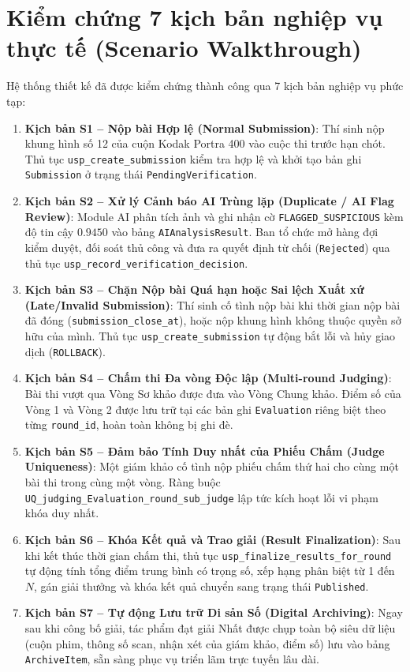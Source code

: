 \section{Kiểm chứng 7 kịch bản nghiệp vụ thực tế (Scenario Walkthrough)}
\label{s:c6_scenarios}

Hệ thống thiết kế đã được kiểm chứng thành công qua 7 kịch bản nghiệp vụ phức tạp:

\begin{enumerate}
    \item \textbf{Kịch bản S1 -- Nộp bài Hợp lệ (Normal Submission)}: Thí sinh nộp khung hình số 12 của cuộn Kodak Portra 400 vào cuộc thi trước hạn chót. Thủ tục \texttt{usp\_create\_submission} kiểm tra hợp lệ và khởi tạo bản ghi \texttt{Submission} ở trạng thái \texttt{PendingVerification}.
    \item \textbf{Kịch bản S2 -- Xử lý Cảnh báo AI Trùng lặp (Duplicate / AI Flag Review)}: Module AI phân tích ảnh và ghi nhận cờ \texttt{FLAGGED\_SUSPICIOUS} kèm độ tin cậy $0.9450$ vào bảng \texttt{AIAnalysisResult}. Ban tổ chức mở hàng đợi kiểm duyệt, đối soát thủ công và đưa ra quyết định từ chối (\texttt{Rejected}) qua thủ tục \texttt{usp\_record\_verification\_decision}.
    \item \textbf{Kịch bản S3 -- Chặn Nộp bài Quá hạn hoặc Sai lệch Xuất xứ (Late/Invalid Submission)}: Thí sinh cố tình nộp bài khi thời gian nộp bài đã đóng (\texttt{submission\_close\_at}), hoặc nộp khung hình không thuộc quyền sở hữu của mình. Thủ tục \texttt{usp\_create\_submission} tự động bắt lỗi và hủy giao dịch (\texttt{ROLLBACK}).
    \item \textbf{Kịch bản S4 -- Chấm thi Đa vòng Độc lập (Multi-round Judging)}: Bài thi vượt qua Vòng Sơ khảo được đưa vào Vòng Chung khảo. Điểm số của Vòng 1 và Vòng 2 được lưu trữ tại các bản ghi \texttt{Evaluation} riêng biệt theo từng \texttt{round\_id}, hoàn toàn không bị ghi đè.
    \item \textbf{Kịch bản S5 -- Đảm bảo Tính Duy nhất của Phiếu Chấm (Judge Uniqueness)}: Một giám khảo cố tình nộp phiếu chấm thứ hai cho cùng một bài thi trong cùng một vòng. Ràng buộc \texttt{UQ\_judging\_Evaluation\_round\_sub\_judge} lập tức kích hoạt lỗi vi phạm khóa duy nhất.
    \item \textbf{Kịch bản S6 -- Khóa Kết quả và Trao giải (Result Finalization)}: Sau khi kết thúc thời gian chấm thi, thủ tục \texttt{usp\_finalize\_results\_for\_round} tự động tính tổng điểm trung bình có trọng số, xếp hạng phân biệt từ 1 đến $N$, gán giải thưởng và khóa kết quả chuyển sang trạng thái \texttt{Published}.
    \item \textbf{Kịch bản S7 -- Tự động Lưu trữ Di sản Số (Digital Archiving)}: Ngay sau khi công bố giải, tác phẩm đạt giải Nhất được chụp toàn bộ siêu dữ liệu (cuộn phim, thông số scan, nhận xét của giám khảo, điểm số) lưu vào bảng \texttt{ArchiveItem}, sẵn sàng phục vụ triển lãm trực tuyến lâu dài.
\end{enumerate}


